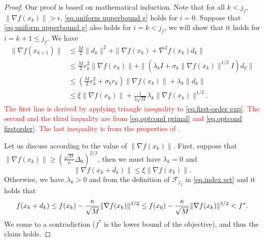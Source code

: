 \begin{proof}
Our proof is based on mathematical induction. Note that for all $k<j_f$, $\|\nabla f(x_k)\| >\epsilon$, \eqref{eq.uniform upperbound g} holds for $i=0$. Suppose that \eqref{eq.uniform upperbound g} also holds for $i=k<j_f$, we will show that it holds for $i=k+1\leq j_f$. We have
        \begin{equation}
            \label{eq.bound gradient}
            \begin{aligned}
                \| \nabla f(x_{k+1})\| &\leq \frac{M}{2}\|d_k\|^2+\|\nabla f(x_k)+\nabla ^2 f(x_k) d_k\|\\
                &\leq \frac{M}{2}r_k^2 \|\nabla f(x_k)\| +\|\left( \lambda_k I+\sigma_k \|\nabla f(x_k)\|^{1/2}I\right) d_k\|\\
                &\leq \left (\frac{M}{2}r_k^2 +\sigma_k r_k\right)\|\nabla f(x_k)\|+\lambda_k\|d_k\|\\
                &\leq \xi \|\nabla f(x_k)\| +\frac{1}{3\sqrt{M}}\lambda_k \|\nabla f(x_k)\|^{1/2}.
            \end{aligned}
        \end{equation}
        \textcolor{red}{
        The first line is derived by applying triangle inequality to \eqref{eq.first-order exp}. The second and the third inquality are from \eqref{eq.optcond primal} and \eqref{eq.optcond firstorder}. The last inequality is from the properties of .}
        
        Let us discuss according to the value of $\|\nabla f(x_k)\|$. First, suppose that $\|\nabla f(x_k)\| \geq \left (\frac{\sqrt{M}}{\kappa}\Delta_0\right)^{2/3}$, then we must have $\lambda_k = 0$ and 
        \begin{equation*}
            \| \nabla f(x_k+d_k)\| \leq \xi \|\nabla f(x_k)\|.
        \end{equation*}
        Otherwise, we have $\lambda_k>0$ and from the definition of $\mathcal{F}_{j_f}$ in \eqref{eq.index set} and  it holds that
        \begin{equation*}
    f(x_k+d_k) \leq f(x_k)-\frac{\kappa}{\sqrt{M}}\|\nabla f(x_k)\|^{3/2} \leq f(x_0)-\frac{\kappa}{\sqrt{M}}\|\nabla f(x_k)\|^{3/2} < f^*.
\end{equation*}
We come to a contradiction ($f^*$ is the lower bound of the objective), and thus the claim holds.


\end{proof}
